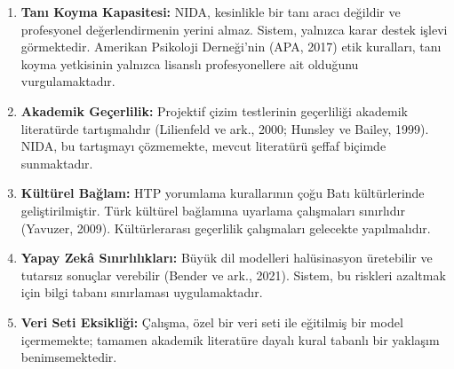 \begin{enumerate}
  \item \textbf{Tanı Koyma Kapasitesi:} NIDA, kesinlikle bir tanı aracı değildir ve profesyonel değerlendirmenin yerini almaz. Sistem, yalnızca karar destek işlevi görmektedir. Amerikan Psikoloji Derneği'nin (APA, 2017) etik kuralları, tanı koyma yetkisinin yalnızca lisanslı profesyonellere ait olduğunu vurgulamaktadır.

  \item \textbf{Akademik Geçerlilik:} Projektif çizim testlerinin geçerliliği akademik literatürde tartışmalıdır (Lilienfeld ve ark., 2000; Hunsley ve Bailey, 1999). NIDA, bu tartışmayı çözmemekte, mevcut literatürü şeffaf biçimde sunmaktadır.

  \item \textbf{Kültürel Bağlam:} HTP yorumlama kurallarının çoğu Batı kültürlerinde geliştirilmiştir. Türk kültürel bağlamına uyarlama çalışmaları sınırlıdır (Yavuzer, 2009). Kültürlerarası geçerlilik çalışmaları gelecekte yapılmalıdır.

  \item \textbf{Yapay Zekâ Sınırlılıkları:} Büyük dil modelleri halüsinasyon üretebilir ve tutarsız sonuçlar verebilir (Bender ve ark., 2021). Sistem, bu riskleri azaltmak için bilgi tabanı sınırlaması uygulamaktadır.

  \item \textbf{Veri Seti Eksikliği:} Çalışma, özel bir veri seti ile eğitilmiş bir model içermemekte; tamamen akademik literatüre dayalı kural tabanlı bir yaklaşım benimsemektedir.
\end{enumerate}

\newpage
